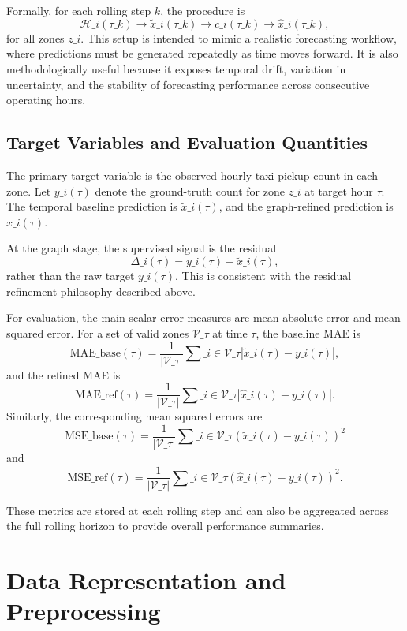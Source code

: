 \documentclass[12pt,a4paper]{report}
\begin{document}
Formally, for each rolling step \(k\), the procedure is
\[
\mathcal{H}\_i(\tau\_k) \rightarrow \tilde{x}\_i(\tau\_k)
\rightarrow c\_i(\tau\_k)
\rightarrow \hat{x}\_i(\tau\_k),
\]
for all zones \(z\_i\). This setup is intended to mimic a realistic forecasting workflow, where predictions must be generated repeatedly as time moves forward. It is also methodologically useful because it exposes temporal drift, variation in uncertainty, and the stability of forecasting performance across consecutive operating hours.

\subsection{Target Variables and Evaluation Quantities}

The primary target variable is the observed hourly taxi pickup count in each zone. Let \(y\_i(\tau)\) denote the ground-truth count for zone \(z\_i\) at target hour \(\tau\). The temporal baseline prediction is \(\tilde{x}\_i(\tau)\), and the graph-refined prediction is \(\hat{x}\_i(\tau)\).

At the graph stage, the supervised signal is the residual
\[
\Delta\_i(\tau) = y\_i(\tau) - \tilde{x}\_i(\tau),
\]
rather than the raw target \(y\_i(\tau)\). This is consistent with the residual refinement philosophy described above.

For evaluation, the main scalar error measures are mean absolute error and mean squared error. For a set of valid zones \(\mathcal{V}\_\tau\) at time \(\tau\), the baseline MAE is
\[
\text{MAE}\_{\text{base}}(\tau)
= \frac{1}{|\mathcal{V}\_\tau|}
\sum\_{i \in \mathcal{V}\_\tau}
|\tilde{x}\_i(\tau) - y\_i(\tau)|,
\]
and the refined MAE is
\[
\text{MAE}\_{\text{ref}}(\tau)
= \frac{1}{|\mathcal{V}\_\tau|}
\sum\_{i \in \mathcal{V}\_\tau}
|\hat{x}\_i(\tau) - y\_i(\tau)|.
\]
Similarly, the corresponding mean squared errors are
\[
\text{MSE}\_{\text{base}}(\tau)
= \frac{1}{|\mathcal{V}\_\tau|}
\sum\_{i \in \mathcal{V}\_\tau}
(\tilde{x}\_i(\tau) - y\_i(\tau))^2
\]
and
\[
\text{MSE}\_{\text{ref}}(\tau)
= \frac{1}{|\mathcal{V}\_\tau|}
\sum\_{i \in \mathcal{V}\_\tau}
(\hat{x}\_i(\tau) - y\_i(\tau))^2.
\]

These metrics are stored at each rolling step and can also be aggregated across the full rolling horizon to provide overall performance summaries.

\section{Data Representation and Preprocessing}
\label{sec:data-representation}
\end{document}
